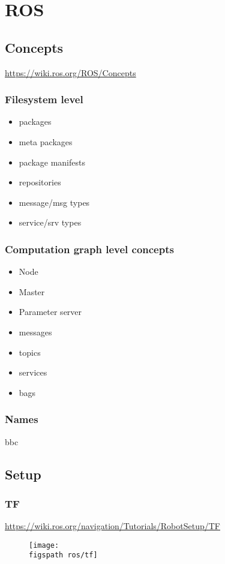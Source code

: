 \chapter{ROS}

\section{Concepts}
\url{https://wiki.ros.org/ROS/Concepts}
    \subsection{Filesystem level}
        \begin{itemize}
            \item packages
            \item meta packages
            \item package manifests
            \item repositories
            \item message/msg types
            \item service/srv types
        \end{itemize}
    \subsection{Computation graph level concepts}
        \begin{itemize}
            \item Node \url{}
            \item Master \url{}
            \item Parameter server \url{}
            \item messages \url{}
            \item topics \url{}
            \item services \url{}
            \item bags \url{}
        \end{itemize}
    \subsection{Names}
        bbc
        

\section{Setup}
    \subsection{TF}
        \url{https://wiki.ros.org/navigation/Tutorials/RobotSetup/TF}
        \begin{figure}
            \centering
            \texttt{[image: \\figspath ros/tf]}
            \caption{}
            \label{fig:tf}
        \end{figure}
